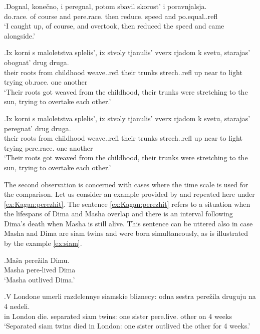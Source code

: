 \exg.\label{ex:comparison:peregnat}Dognal, kone\v{c}no, i peregnal, potom sbavil skorost' i poravnjalsja.\\
do.race. {of course} and pere.race. then reduce. speed and po.equal..refl\\
\trans `I caught up, of course, and overtook, then reduced the speed and came alongside.'

\exg.\label{ex:comparison:obognat}Ix korni s maloletstva splelis', ix stvoly tjanulis' vverx rjadom k svetu, starajas' obognat' drug druga.\\
their roots from childhood weave..refl their trunks strech..refl up near to light trying ob.race. one another\\
\trans `Their roots got weaved from the childhood, their trunks were stretching to the sun, trying to overtake each other.'\\

\exg.\label{ex:peregnat}Ix korni s maloletstva splelis', ix stvoly tjanulis' vverx rjadom k svetu, starajas' peregnat' drug druga.\\
their roots from childhood weave..refl their trunks strech..refl up near to light trying pere.race. one another\\
\trans `Their roots got weaved from the childhood, their trunks were stretching to the sun, trying to overtake each other.'

The second observation is concerned with cases where the time scale is used for the comparison. Let us consider an example provided by \citet[142]{Kagan:book} and repeated here under \ref{ex:Kagan:perezhit}. The sentence \ref{ex:Kagan:perezhit} refers to a situation when the lifespans of Dima and Masha overlap and there is an interval following Dima's death when Masha is still alive. This sentence can be uttered also in case Masha and Dima are siam twins and were born simultaneously, as is illustrated by the example \ref{ex:siam}.

\exg.\label{ex:Kagan:perezhit}Ma\v{s}a pere\v{z}ila Dimu.\\
Masha pere-lived Dima\\
\trans `Masha outlived Dima.'

\exg.\label{ex:siam}V Londone umerli razdelennye siamskie bliznecy: odna sestra pere\v{z}ila druguju na 4 nedeli.\\
in London die. separated siam twins: one sister pere.live. other on 4 weeks\\
\trans `Separated siam twins died in London: one sister outlived the other for 4 weeks.'

